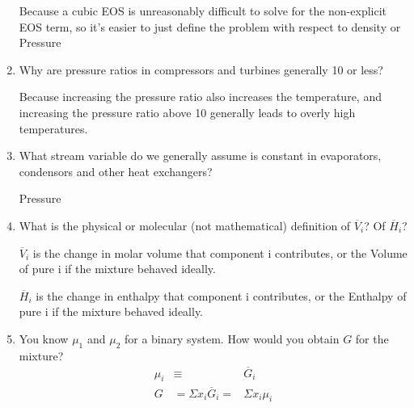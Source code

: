 \documentclass[a4paper]{article}
\begin{document}
\begin{enumerate}
	Because a cubic EOS is unreasonably difficult to solve for the non-explicit EOS term, so it's easier to just define the problem with respect to density or Pressure
\item Why are pressure ratios in compressors and turbines generally 10 or less?

	Because increasing the pressure ratio also increases the temperature, and increasing the pressure ratio above 10 generally leads to overly high temperatures.
\item What stream variable do we generally assume is constant in evaporators, condensors and other heat exchangers?

	Pressure
\item What is the physical or molecular (not mathematical) definition of $\overline{V}_i$? Of $\overline{H}_i$?

	$\overline{V}_i$ is the change in molar volume that component i contributes, or the Volume of pure i if the mixture behaved ideally.

	$\overline{H}_i$ is the change in enthalpy that component i contributes, or the Enthalpy of pure i if the mixture behaved ideally.
\item You know $\mu_1$ and $\mu_2$ for a binary system. How would you obtain $G$ for the mixture?
	\begin{eqnarray}
		\mu_i &\equiv& \overline{G}_i\\
		G&=\Sigma x_i \overline{G}_i =& \Sigma x_i \mu_i
		\label{14}
	\end{eqnarray}

\end{enumerate}
\end{document}
